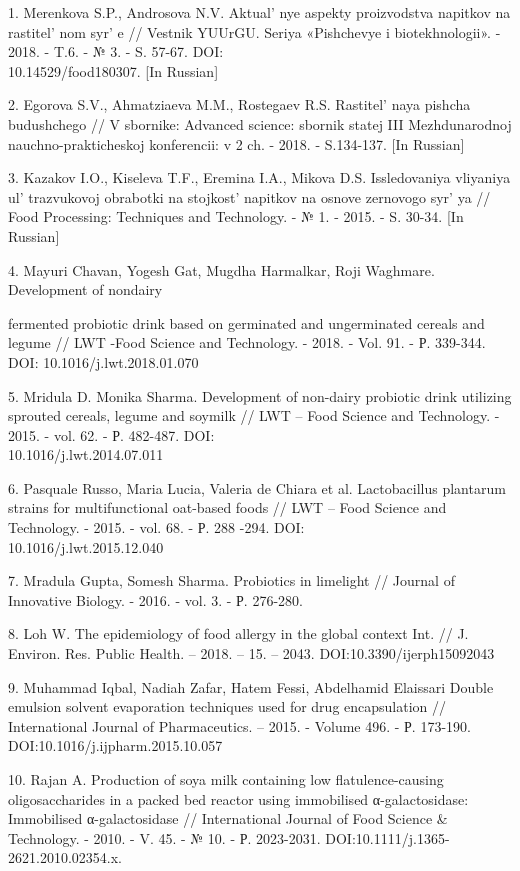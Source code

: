 \begin{references}
1. Merenkova S.P., Androsova N.V. Aktual' nye aspekty
proizvodstva napitkov na rastitel' nom
syr' e // Vestnik YUUrGU. Seriya «Pishchevye i
biotekhnologii». - 2018. - T.6. - № 3. - S. 57-67. DOI:
\\10.14529/food180307. {[}In Russian{]}

2. Egorova S.V., Ahmatziaeva M.M., Rostegaev R.S.
Rastitel' naya pishcha budushchego // V sbornike:
Advanced science: sbornik statej III Mezhdunarodnoj
nauchno-prakticheskoj konferencii: v 2 ch. - 2018. - S.134-137. {[}In
Russian{]}

3. Kazakov I.O., Kiseleva T.F., Eremina I.A., Mikova D.S. Issledovaniya
vliyaniya ul' trazvukovoj obrabotki na
stojkost'{} napitkov na osnove zernovogo
syr' ya // Food Processing: Techniques and Technology. -
№ 1. - 2015. - S. 30-34. {[}In Russian{]}

4. Mayuri Chavan, Yogesh Gat, Mugdha Harmalkar, Roji Waghmare.
Development of nondairy

fermented probiotic drink based on germinated and ungerminated cereals
and legume // LWT -Food Science and Technology. - 2018. - Vol. 91. - Р.
339-344. DOI: 10.1016/j.lwt.2018.01.070

5. Mridula D. Monika Sharma. Development of non-dairy probiotic drink
utilizing sprouted cereals, legume and soymilk // LWT -- Food Science
and Technology. - 2015. - vol. 62. - Р. 482-487. DOI:
\\10.1016/j.lwt.2014.07.011

6. Pasquale Russo, Maria Lucia, Valeria de Chiara et al. Lactobacillus
plantarum strains for multifunctional oat-based foods // LWT -- Food
Science and Technology. - 2015. - vol. 68. - Р. 288 -294. DOI:
\\10.1016/j.lwt.2015.12.040

7. Mradula Gupta, Somesh Sharma. Probiotics in limelight // Journal of
Innovative Biology. - 2016. - vol. 3. - Р. 276-280.

8. Loh W. The epidemiology of food allergy in the global context Int. //
J. Environ. Res. Public Health. -- 2018. -- 15. -- 2043.
DOI:10.3390/ijerph15092043

9. Muhammad Iqbal, Nadiah Zafar, Hatem Fessi, Abdelhamid Elaissari
Double emulsion solvent evaporation techniques used for drug
encapsulation // International Journal of Pharmaceutics. -- 2015. -
Volume 496. - Р. 173-190. DOI:10.1016/j.ijpharm.2015.10.057

10. Rajan A. Production of soya milk containing low flatulence-causing
oligosaccharides in a packed bed reactor using immobilised
α-galactosidase: Immobilised α-galactosidase // International Journal of
Food Science \& Technology. - 2010. - V. 45. - № 10. - Р. 2023-2031.
DOI:10.1111/j.1365- 2621.2010.02354.x.
\end{references}

